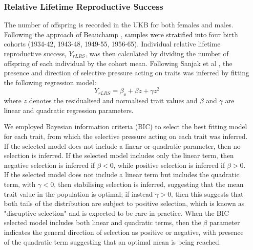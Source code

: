 \documentclass[12pt]{zHenriquesLab-StyleBioRxiv}
\begin{document}
{{\subsubsection*{Relative Lifetime Reproductive Success}
The number of offspring is recorded in the UKB for both females and
males. Following the approach of Beauchamp \cite{v_select2}, samples were 
stratified into four birth cohorts (1934-42, 1943-48, 1949-55, 1956-65). Individual relative
lifetime reproductive success, $Y_{rLRS}$, was then calculated by
dividing the number of offspring of each individual by the cohort
mean. Following Sanjak et al \cite{Sanjak2018}, the presence and
direction of selective pressure acting on traits was inferred by
fitting the following regression model:
\begin{equation}
Y_{rLRS} = \beta_o + \beta z + \gamma z^2 \label{math:LRS}
\end{equation}
where $z$ denotes the residualised and normalised trait values and
$\beta$ and $\gamma$ are linear and quadratic regression parameters.

We employed Bayesian information criteria (BIC) to select the best
fitting model for each trait, from which the selective pressure acting
on each trait was inferred. If the selected model does not include a linear
or quadratic parameter, then no selection is inferred. If the selected model
includes only the linear term, then negative selection is inferred if $\beta<0$, 
while positive selection is inferred if $\beta>0$. If the selected model does not 
include a linear term but includes the quadratic term, with $\gamma<0$, then 
stabilising selection is inferred, suggesting that the mean trait value in the 
population is optimal; if instead $\gamma>0$, then this suggests that 
both tails of the distribution are subject to positive selection, which is known as 
"disruptive selection" and is expected to be rare in practice. When the BIC selected 
model includes both linear and quadratic terms, then the $\beta$ parameter indicates 
the general direction of selection as positive or negative, with presence of the quadratic 
term suggesting that an optimal mean is being reached.
%
}}
\end{document}
